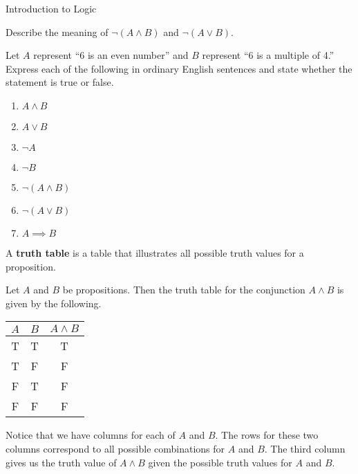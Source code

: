 \begin{section}{Introduction to Logic}
\begin{skeleton}
\begin{center}
\end{center}
\end{skeleton}

\begin{problem}
Describe the meaning of $\neg (A \wedge B)$ and $\neg (A \vee B)$.
\end{problem}

\begin{problem}\label{prob:translations}
Let $A$ represent ``6 is an even number'' and $B$ represent ``6 is a multiple of 4.''  Express each of the following in ordinary English sentences and state whether the statement is true or false.
\begin{enumerate}[label=\textrm{(\alph*)}]
  \item $A \wedge B$
  \item $A \vee B$
  \item $\neg A$
  \item $\neg B$
  \item $\neg (A \wedge B)$
  \item $\neg (A \vee B)$
  \item $A \implies B$
\end{enumerate}
\end{problem}

\begin{definition}
A \textbf{truth table} is a table that illustrates all possible truth values for a proposition.  
\end{definition}

\begin{example}
Let $A$ and $B$ be propositions.  Then the truth table for the conjunction $A\wedge B$ is given by the following.
\begin{center}
\begin{tabular}{@{}ccc@{}}
\toprule
$A$  &  $B$ & $A \wedge B$  \\
\midrule
T & T & T  \\ 
T & F & F  \\ 
F & T & F  \\ 
F & F & F  \\
\bottomrule
\end{tabular}
\end{center}
Notice that we have columns for each of $A$ and $B$.  The rows for these two columns correspond to all possible combinations for $A$ and $B$.  The third column gives us the truth value of $A\wedge B$ given the possible truth values for $A$ and $B$.
\end{example}


\end{section}
